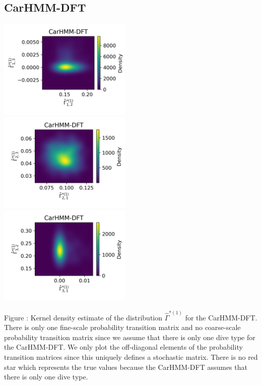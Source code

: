 \documentclass{article}
\begin{document}
        \subsection{CarHMM-DFT}
        \begin{center}
        \includegraphics[width=2.5in]{../Plots/hmm_FV_Gamma_density_0_row_0.png} \\
        \includegraphics[width=2.5in]{../Plots/hmm_FV_Gamma_density_0_row_1.png} \\
        \includegraphics[width=2.5in]{../Plots/hmm_FV_Gamma_density_0_row_2.png} \\
        \end{center}
        
        \noindent Figure : Kernel density estimate of the distribution $\hat \Gamma^{*(1)}$ for the CarHMM-DFT. There is only one fine-scale probability transition matrix and no coarse-scale probability transition matrix since we assume that there is only one dive type for the CarHMM-DFT. We only plot the off-diagonal elements of the probability transition matrices since this uniquely defines a stochastic matrix. There is no red star which represents the true values because the CarHMM-DFT assumes that there is only one dive type.
        \addtocounter{fignum}{1}
\end{document}
